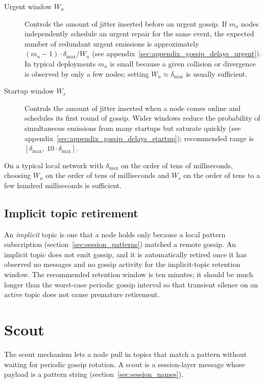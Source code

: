 \begin{description}
    \item[Urgent window $W_u$] Controls the amount of jitter inserted before an
    urgent gossip. If $m_u$ nodes independently schedule an urgent repair for
    the same event, the expected number of redundant urgent emissions is
    approximately $(m_u - 1) \cdot \delta_{\max} / W_u$ (see
    appendix~\ref{sec:appendix_gossip_delays_urgent}).
    In typical deployments $m_u$ is small because a given collision or
    divergence is observed by only a few nodes; setting
    $W_u \approx \delta_{\max}$ is usually sufficient.

    \item[Startup window $W_s$] Controls the amount of jitter inserted when a
    node comes online and schedules its first round of gossip.
    Wider windows reduce the probability of simultaneous emissions from many
    startups but saturate quickly (see
    appendix~\ref{sec:appendix_gossip_delays_startup});
    recommended range is $[\delta_{\max},\ 10 \cdot \delta_{\max}]$.
\end{description}

On a typical local network with $\delta_{\max}$ on the order of tens of
milliseconds, choosing $W_u$ on the order of tens of milliseconds and $W_s$ on
the order of tens to a few hundred milliseconds is sufficient.

\subsection{Implicit topic retirement}

An \emph{implicit} topic is one that a node holds only because a local pattern
subscription (section~\ref{sec:session_patterns}) matched a remote gossip. An
implicit topic does not emit gossip, and it is automatically retired once it has
observed no messages and no gossip activity for the implicit-topic retention
window. The recommended retention window is ten minutes; it should be much
longer than the worst-case periodic gossip interval so that transient silence
on an active topic does not cause premature retirement.

\section{Scout}\label{sec:session_scout}

The scout mechanism lets a node pull in topics that match a pattern without
waiting for periodic gossip rotation. A scout is a session-layer message whose
payload is a pattern string (section~\ref{sec:session_names}).

